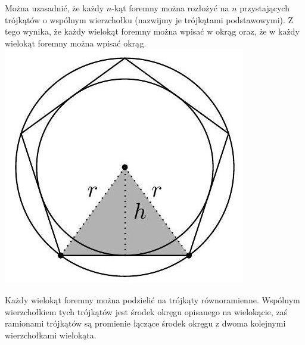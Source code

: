 \documentclass[10pt]{article}
\begin{document}
Można uzasadnić, że każdy \(n\)-kąt foremny można rozłożyć na \(n\) przystających trójkątów o wspólnym wierzchołku (nazwijmy je trójkątami podstawowymi). Z tego wynika, że każdy wielokąt foremny można wpisać w okrąg oraz, że w każdy wielokąt foremny można wpisać okrąg.\\
\includegraphics[max width=\textwidth, center]{2024_11_21_e9b4faa005d5be2cc318g-055}

Każdy wielokąt foremny można podzielić na trójkąty równoramienne. Wspólnym wierzchołkiem tych trójkątów jest środek okręgu opisanego na wielokącie, zaś ramionami trójkątów są promienie łączące środek okręgu z dwoma kolejnymi wierzchołkami wielokąta.
\end{document}
